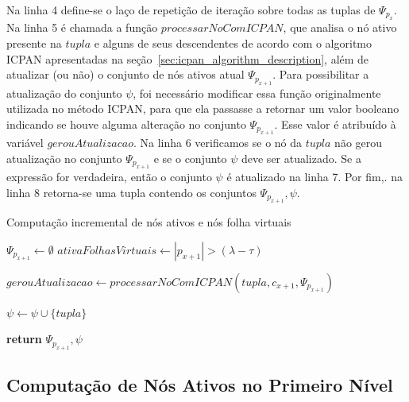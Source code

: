 Na linha 4 define-se o laço de repetição de iteração sobre todas as tuplas de $\Psi_{p_x}$. Na linha 5 é chamada a função $processarNoComICPAN$, que analisa o nó ativo presente na $tupla$ e alguns de seus descendentes de acordo com o algoritmo ICPAN apresentadas na seção~\ref{sec:icpan_algorithm_description}, além de atualizar (ou não) o conjunto de nós ativos atual $\Psi_{p_{x+1}}$. Para possibilitar a atualização do conjunto $\psi$, foi necessário modificar essa função originalmente utilizada no método ICPAN, para que ela passasse a retornar um valor booleano indicando se houve alguma alteração no conjunto $\Psi_{p_{x+1}}$. Esse valor é atribuído à variável $gerouAtualizacao$. Na linha 6 verificamos se o nó da $tupla$ não gerou atualização no conjunto $\Psi_{p_{x+1}}$ e se o conjunto $\psi$ deve ser atualizado. Se a expressão for verdadeira, então o conjunto $\psi$ é atualizado na linha 7. Por fim,. na linha 8 retorna-se uma tupla contendo os conjuntos $\Psi_{p_{x+1}}, \psi$.

\begin{algorithm}[t]
\caption{Computação incremental de nós ativos e nós folha virtuais }\label{alg:compute_active_and_virtual_leaf_nodes}
\begin{algorithmic}[1]
    \State $\Psi_{p_{x+1}} \leftarrow \emptyset$
    \State $ativaFolhasVirtuais \leftarrow |p_{x+1}| > (\lambda - \tau)$
    
        \State $gerouAtualizacao \leftarrow processarNoComICPAN(tupla, c_{x+1}, \Psi_{p_{x+1}})$
        
            \State $\psi \leftarrow \psi \cup \{tupla\}$
        \EndIf
    \EndFor
    
    \State \textbf{return} $\Psi_{p_{x+1}}, \psi$
\EndFunction
\end{algorithmic}
\end{algorithm}

\subsection{Computação de Nós Ativos no Primeiro Nível}
\label{sec:first_level_active_node_set_computation}


